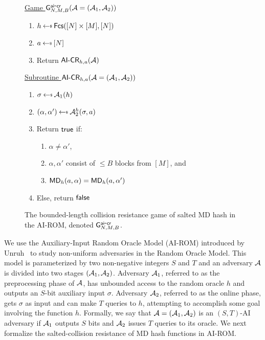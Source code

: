 \ifnum{}
	\renewcommand{\len}{0.35}
	\renewcommand{\lenn}{0.55}
	\renewcommand{\lennn}{}
\else
	\renewcommand{\len}{0.35}
	\renewcommand{\lenn}{0.55}
	\renewcommand{\lennn}{}
\fi
   \begin{figure}[t]
    \twoCols{\len}{\lenn}
    {
    \underline{Game $\mathsf{G}^{\mathsf{ai}\mbox{-}\mathsf{cr}}_{N,M,B}(\mathcal{A}=(\mathcal{A}_1,\mathcal{A}_2))$}
    \begin{enumerate}
    \item $h \getsr \Func([N]\times [M], [N])$
    \item $a \getsr [N]$
    \item Return ${\mathsf{AI}\mbox{-}\mathsf{CR}}_{h,a}(\mathcal{A})$
    \end{enumerate}
	}
	{
    \underline{Subroutine ${\mathsf{AI}\mbox{-}\mathsf{CR}}_{h,a}(\mathcal{A}=(\mathcal{A}_1,\mathcal{A}_2))$}
    \begin{enumerate}
    \item $\sigma \getsr \advA_1(h)$
    \item $(\alpha,\alpha')\getsr \advA_2^h(\sigma,a)$
    \item Return $\mathsf{true}$ if: 
    \begin{enumerate}
    \item $\alpha\neq \alpha'$, 
    \item  $\alpha,\alpha'$ consist of $\le B$ blocks from $[M]$, \ifnum{} and\fi
    \item $\mathsf{MD}_h(a,\alpha)=\mathsf{MD}_h(a,\alpha')$
    \end{enumerate}
    \item Else, return $\mathsf{false}$
    \end{enumerate}
	}
	\caption{The bounded-length collision resistance game of salted MD hash in the AI-ROM, denoted $\mathsf{G}^{\mathsf{ai}\mbox{-}\mathsf{cr}}_{N,M,B}$.}
    \label{fig:aicrMD}
    \label{fig:ex-game}
   \end{figure}


 We use the Auxiliary-Input Random Oracle Model (AI-ROM) introduced by Unruh~\cite{Unruh07} to study non-uniform adversaries in the Random Oracle Model.
 This model is parameterized by two non-negative integers $S$ and $T$ and an adversary $\mathcal{A}$ is divided into two stages $(\mathcal{A}_1,\mathcal{A}_2)$. Adversary $\mathcal{A}_1$, referred to as the preprocessing phase of $\mathcal{A}$, has unbounded access to the random oracle $h$ and outputs an $S$-bit auxiliary input $\sigma$. Adversary $\mathcal{A}_2$, referred to as the online phase, gets $\sigma $ as input and can make $T$ queries to $h$, attempting to accomplish some goal involving the function $h$. 
 Formally, we say that $\mathcal{A}=(\mathcal{A}_1,\mathcal{A}_2)$ is an $(S,T)$-AI adversary if $\mathcal{A}_1$ outputs $S$ bits and $\mathcal{A}_2$ issues $T$ queries to its oracle.
 We next formalize the salted-collision resistance of MD hash functions in AI-ROM.



